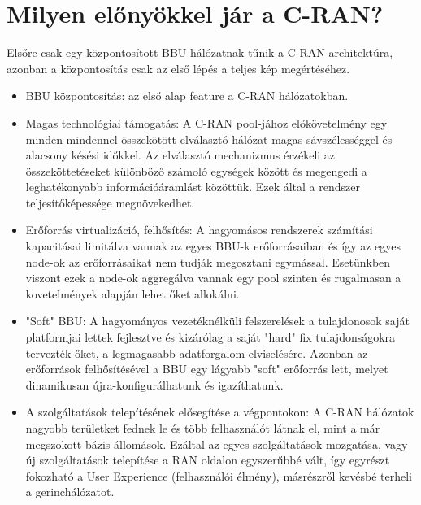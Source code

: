 \section{Milyen előnyökkel jár a C-RAN?}
\hspace{2mm} \indent Elsőre csak egy központosított BBU hálózatnak tűnik a C-RAN architektúra, azonban a központosítás csak az első lépés a teljes kép megértéséhez. \cite{RecentCRANProg}
\begin{itemize}
\item BBU központosítás: az első alap feature a C-RAN hálózatokban.
\item Magas technológiai támogatás: A C-RAN pool-jához előkövetelmény egy minden-mindennel összekötött elválasztó-hálózat magas sávszélességgel és alacsony késési időkkel. Az elválasztó mechanizmus érzékeli az összeköttetéseket különböző számoló egységek között és megengedi a leghatékonyabb információáramlást közöttük. Ezek által a rendszer teljesítőképessége megnövekedhet.
\item Erőforrás virtualizáció, felhősítés: A hagyomásos rendszerek számítási kapacitásai limitálva vannak az egyes BBU-k erőforrásaiban és így az egyes node-ok az erőforrásaikat nem tudják megosztani egymással. Esetünkben viszont ezek a node-ok aggregálva vannak egy pool szinten és rugalmasan a kovetelmények alapján lehet őket allokálni.
\item "Soft" BBU: A hagyományos vezetéknélküli felszerelések a tulajdonosok saját platformjai lettek fejlesztve és kizárólag a saját "hard" fix tulajdonságokra tervezték őket, a legmagasabb adatforgalom elviselésére.
Azonban az erőforrások felhősítésével a BBU egy lágyabb "soft" erőforrás lett, melyet dinamikusan újra-konfigurálhatunk és igazíthatunk.
\item A szolgáltatások telepítésének elősegítése a végpontokon: A C-RAN hálózatok nagyobb területket fednek le és több felhasználót látnak el, mint a már megszokott bázis állomások. Ezáltal az egyes szolgáltatások mozgatása, vagy új szolgáltatások telepítése a RAN oldalon egyszerűbbé vált, így egyrészt fokozható a User Experience (felhasználói élmény), másrészről kevésbé terheli a gerinchálózatot.
\end{itemize}

